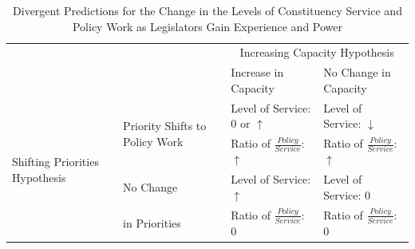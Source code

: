 \documentclass[12pt]{article}
\begin{document}
{\renewcommand{\arraystretch}{1.1}%

\begin{table}[]

\caption{Divergent Predictions for the Change in the Levels of Constituency Service and Policy Work as Legislators Gain Experience and Power}\label{t:theory}

\begin{tabular}[t]{p{.15\linewidth}|p{.20\linewidth}|p{.32\linewidth}|p{.33\linewidth}|}

\multicolumn{2}{l}{\multirow{2}{*}{}} & \multicolumn{2}{c}{Increasing Capacity Hypothesis} \\ \cline{3-4}

\multicolumn{2}{l|}{}    &  Increase in Capacity  &   No Change in Capacity \\ \cline{2-4} 

\multirow{4}{1.8cm}{Shifting Priorities Hypothesis}  &   \multirow{2}{3cm}{Priority Shifts to Policy Work}   &  Level of Service: 0 or $\uparrow$  &  Level of Service: $\downarrow$  \\ 

& &  Ratio of $\frac{Policy}{Service}$: $\uparrow$   &   Ratio of $\frac{Policy}{Service}$: $\uparrow$  \\ \cline{2-4}

 &  No Change    &  Level of Service: $\uparrow$  & Level of Service: $0$ \\ 

 & in Priorities &   Ratio of $\frac{Policy}{Service}$: $0$  & Ratio of $\frac{Policy}{Service}$: $0$\\ \cline{2-4}

\end{tabular}

\end{table}


}
\end{document}
